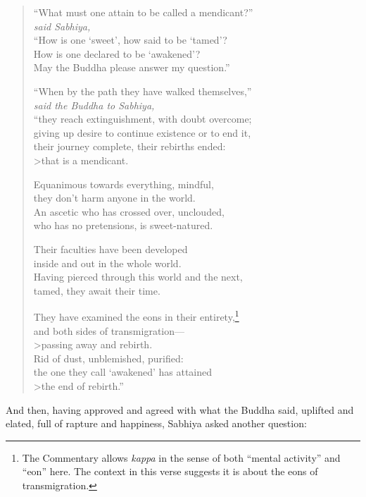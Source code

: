 \documentclass[12pt,openany]{book}%
\newcommand*{\scspeaker}[1]{\hspace{2em}\textit{#1}}
\begin{document}
\begin{verse}%
“What must one attain to be called a mendicant?” \\
\scspeaker{said Sabhiya, }\\
“How is one ‘sweet’, how said to be ‘tamed’? \\
How is one declared to be ‘awakened’? \\
May the Buddha please answer my question.” 

“When by the path they have walked themselves,” \\
\scspeaker{said the Buddha to Sabhiya, }\\
“they reach extinguishment, with doubt overcome; \\
giving up desire to continue existence or to end it, \\
their journey complete, their rebirths ended: \\>that is a mendicant. 

Equanimous towards everything, mindful, \\
they don’t harm anyone in the world. \\
An ascetic who has crossed over, unclouded, \\
who has no pretensions, is sweet-natured. 

Their faculties have been developed \\
inside and out in the whole world. \\
Having pierced through this world and the next, \\
tamed, they await their time. 

They have examined the eons in their entirety,\footnote{The Commentary allows \textit{kappa} in the sense of both “mental activity” and “eon” here. The context in this verse suggests it is about the eons of transmigration. } \\
and both sides of transmigration—\\>passing away and rebirth. \\
Rid of dust, unblemished, purified: \\
the one they call ‘awakened’ has attained \\>the end of rebirth.” 

%
\end{verse}

And then, having approved and agreed with what the Buddha said, uplifted and elated, full of rapture and happiness, Sabhiya asked another question: 
\end{document}
